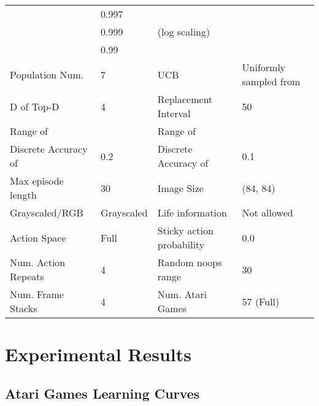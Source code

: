 \begin{table}[H]
\begin{center}
{\begin{tabular}{l l l l }
 & 0.997  &   &\\

 & 0.999  &  (log scaling) &  \\ 

 & 0.99 &    &  \\ 

Population Num.   & 7  &  UCB  & Uniformly sampled from \\ 

D of Top-D  & 4 & Replacement Interval   & 50   \\
Range of  &   & Range of  & \\ 
Discrete Accuracy of  & 0.2 & Discrete Accuracy of  & 0.1 \\
Max episode length   & 30  & Image Size & (84, 84) \\
Grayscaled/RGB      & Grayscaled & Life information & Not allowed  \\
Action Space & Full & Sticky action probability  & 0.0 \\
Num. Action Repeats & 4 & Random noops range  & 30\\
Num. Frame Stacks & 4 & Num. Atari Games & 57 (Full)\\
\bottomrule
\end{tabular} 
}
\end{center}
\end{table}



\clearpage



\section{Experimental Results}
\label{appendix: experiment results}




\subsection{Atari Games Learning Curves}



\renewcommand{\thesubfigure}{\arabic{subfigure}.}
\setcounter{subfigure}{0}

\begin{figure}[!ht] 
\end{figure}

